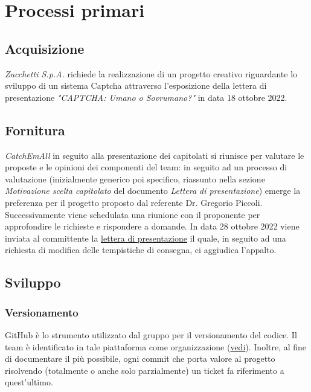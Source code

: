 \section{Processi primari}

\subsection{Acquisizione}
\textit{Zucchetti S.p.A.} richiede la realizzazione di un progetto creativo riguardante lo sviluppo di un sistema Captcha attraverso l'esposizione della lettera di presentazione \textit{"CAPTCHA: Umano o Sovrumano?"} in data 18 ottobre 2022.

\subsection{Fornitura}
\textit{CatchEmAll} in seguito alla presentazione dei capitolati si riunisce per valutare le proposte e le opinioni dei componenti del team: in seguito ad un processo di valutazione (inizialmente generico poi specifico, riassunto nella sezione \textit{Motivazione scelta capitolato} del documento \textit{Lettera di presentazione}) emerge la preferenza per il progetto proposto dal referente Dr. Gregorio Piccoli.  
Successivamente viene schedulata una riunione con il proponente per approfondire le richieste e rispondere a domande. 
In data 28 ottobre 2022 viene inviata al committente la \href{https://github.com/catchEmAll-SWE/catchEmAll-Docs/blob/main/Assegnazione%20appalti/LetteraCandidatura.pdf}{lettera di presentazione} il quale, in seguito ad una richiesta di modifica delle tempistiche di consegna, ci aggiudica l'appalto.

\subsection{Sviluppo}
    \subsubsection{Versionamento}
    GitHub è lo strumento utilizzato dal gruppo per il versionamento del codice.
    Il team è identificato in tale piattaforma come organizzazione (\href{https://github.com/catchEmAll-SWE}{vedi}).
    Inoltre, al fine di documentare il più possibile, ogni commit che porta valore al progetto risolvendo (totalmente o anche solo parzialmente) un ticket fa riferimento a quest'ultimo. 
    
